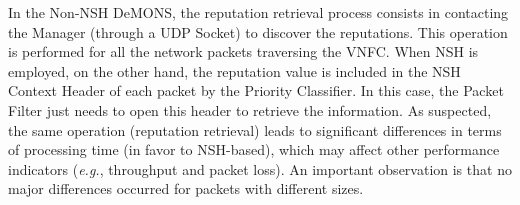 
In the Non-NSH DeMONS, the reputation retrieval process consists in contacting the Manager (through a UDP Socket) to discover the reputations. This operation is performed for all the network packets traversing the VNFC. When NSH is employed, on the other hand, the reputation value is included in the NSH Context Header of each packet by the Priority Classifier. In this case, the Packet Filter just needs to open this header to retrieve the information. As suspected, the same operation (reputation retrieval) leads to significant differences in terms of processing time (in favor to NSH-based), which may affect other performance indicators (\textit{e.g.}, throughput and packet loss). An important observation is that no major differences occurred for packets with different sizes.

